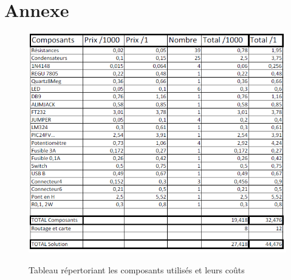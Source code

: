 \documentclass[11pt, french]{article} %
\begin{document}
\pagebreak
\section{Annexe}
\medskip
\begin{figure}[!h]
	\centering
	\includegraphics[width=15cm]{SolutionAnalogique/cout.png}
	\label{cout}
	\caption{Tableau répertoriant les composants utilisés et leurs coûts}
\end{figure}
\end{document}
